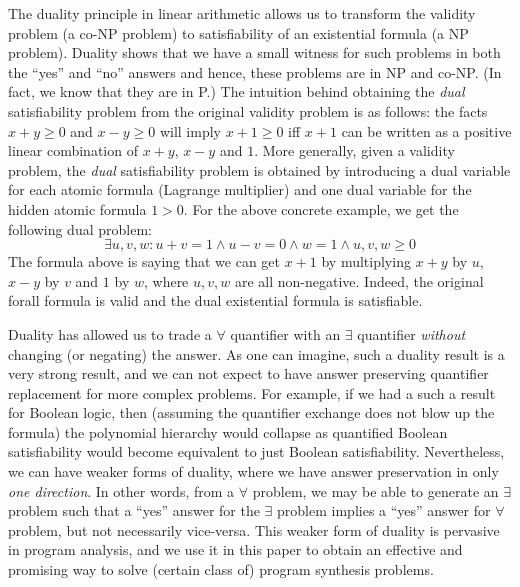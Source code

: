 \documentclass[preprint]{sig-alternate-05-2015}
\begin{document}
The duality principle in linear arithmetic allows us to transform
the validity problem (a co-NP problem) to satisfiability of an existential
formula  (a NP problem). 
Duality shows that we have a small witness for such problems
in both the ``yes'' and ``no'' answers and hence, these problems
are in NP and co-NP. (In fact, we know that they are in P.)
The intuition behind obtaining the {\em{dual}} satisfiability problem from
the original validity problem is as follows: 
the facts 
 $x+y\geq 0$ and $x-y\geq 0$ will imply $x+1 \geq 0$ iff
$x+1$ can be written as a positive linear combination of $x+y$, $x-y$ and $1$.
More generally, given a validity problem, the {\em{dual}} satisfiability problem is 
obtained by introducing a dual variable for each atomic formula
(Lagrange multiplier) and one dual variable for the hidden atomic formula $1 > 0$.
For the above concrete example, we get the following dual problem:
$$
 \exists{u,v,w}: u+v=1 \wedge u-v = 0 \wedge w=1 \wedge u,v,w \geq 0 
$$
The formula above is saying that we can get $x+1$ by multiplying $x+y$ by $u$,
$x-y$ by $v$ and $1$ by $w$, where $u,v,w$ are all non-negative.
Indeed, the original forall formula is valid and the dual existential formula
is satisfiable.

Duality has allowed us to trade a $\forall$ quantifier with an $\exists$ quantifier
{\em{without}} changing (or negating) the answer. 
As one can imagine, such a duality result is a very strong result, and we can not
expect to have answer preserving quantifier replacement for more complex problems.
For example, if we had a such a result for Boolean logic, then (assuming the 
quantifier exchange does not blow up the formula) the polynomial hierarchy would
collapse as quantified Boolean satisfiability would become equivalent to 
just Boolean satisfiability.
Nevertheless, we can have weaker forms of duality, where we have answer preservation
in only {\em{one direction}}. In other words, from a $\forall$ problem, we may be
able to generate an $\exists$ problem such that a ``yes'' answer for the
$\exists$ problem implies a ``yes'' answer for $\forall$ problem, but not
necessarily vice-versa.  This weaker form of duality is pervasive in program
analysis, %
and we use it in this paper to obtain an
effective and promising way to solve (certain class of) program synthesis problems.
\end{document}

